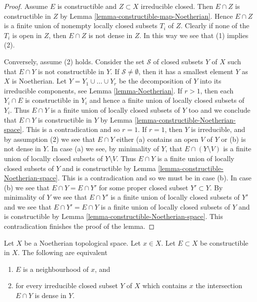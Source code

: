 \begin{proof}
Assume $E$ is constructible and $Z \subset X$ irreducible closed.
Then $E \cap Z$ is constructible in $Z$ by
Lemma \ref{lemma-constructible-map-Noetherian}.
Hence $E \cap Z$ is a finite union of nonempty locally closed subsets
$T_i$ of $Z$. Clearly if none of the $T_i$ is open in $Z$, then
$E \cap Z$ is not dense in $Z$. In this way we see that (1) implies (2).

\medskip\noindent
Conversely, assume (2) holds. Consider the set $\mathcal{S}$ of closed
subsets $Y$ of $X$ such that $E \cap Y$ is not constructible in $Y$.
If $\mathcal{S} \not = \emptyset$, then it has a smallest element $Y$
as $X$ is Noetherian.
Let $Y = Y_1 \cup \ldots \cup Y_r$ be the decomposition of $Y$ into its
irreducible components, see
Lemma \ref{lemma-Noetherian}.
If $r > 1$, then each $Y_i \cap E$ is constructible in $Y_i$ and hence
a finite union of locally closed subsets of $Y_i$. Thus $E \cap Y$
is a finite union of locally closed subsets of $Y$ too and we conclude
that $E \cap Y$ is constructible in $Y$ by
Lemma \ref{lemma-constructible-Noetherian-space}.
This is a contradication and so $r = 1$. If $r = 1$, then $Y$ is
irreducible, and by assumption (2) we see that $E \cap Y$ either
(a) contains an open $V$ of $Y$ or (b) is not dense in $Y$.
In case (a) we see, by minimality of $Y$, that $E \cap (Y \setminus V)$
is a finite union of locally closed subsets of $Y \setminus V$. Thus
$E \cap Y$ is a finite union of locally closed subsets of $Y$ and is
constructible by
Lemma \ref{lemma-constructible-Noetherian-space}.
This is a contradication and so we must be in case (b).
In case (b) we see that $E \cap Y = E \cap Y'$ for some proper closed
subset $Y' \subset Y$. By minimality of $Y$ we see that
$E \cap Y'$ is a finite union of locally closed subsets of $Y'$ and
we see that $E \cap Y' = E \cap Y$ is a finite union of locally closed
subsets of $Y$ and is constructible by
Lemma \ref{lemma-constructible-Noetherian-space}.
This contradication finishes the proof of the lemma.
\end{proof}

\begin{lemma}
\label{lemma-construcible-neighbourhood-Noetherian}
Let $X$ be a Noetherian topological space.
Let $x \in X$.
Let $E \subset X$ be constructible in $X$.
The following are equivalent
\begin{enumerate}
\item $E$ is a neighbourhood of $x$, and
\item for every irreducible closed subset $Y$ of $X$ which contains
$x$ the intersection $E \cap Y$ is dense in $Y$.
\end{enumerate}
\end{lemma}

